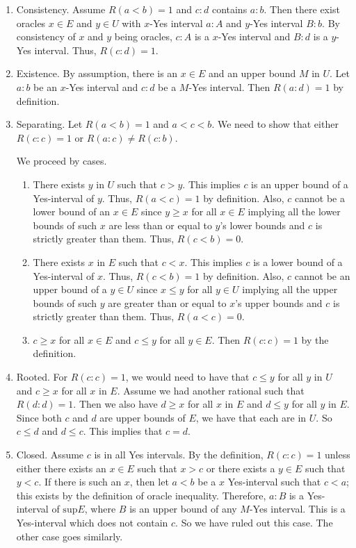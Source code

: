 \documentclass[12pt]{article}
\theoremstyle{remark}
\begin{document}
\begin{enumerate}
    \item Consistency. Assume $R(a \lt b)=1$ and $c:d$ contains $a:b$. Then there exist oracles $x \in E$ and $y \in U$ with $x$-Yes interval $a:A$ and $y$-Yes interval $B:b$. By consistency of $x$ and $y$ being oracles, $c:A$ is a $x$-Yes interval and $B:d$ is a $y$-Yes interval. Thus, $R(c:d) = 1$.
    \item Existence. By assumption, there is an $x \in E$ and an upper bound $M$ in $U$. Let $a:b$ be an $x$-Yes interval and $c:d$ be a $M$-Yes interval. Then $R(a:d) = 1$ by definition.  
    \item Separating. Let $R(a\lt b)=1$ and $a < c< b$. We need to show that either $R(c:c)=1$ or $R(a:c) \neq R(c:b)$. 

    We proceed by cases.
    \begin{enumerate}
    \item There exists $y$ in $U$ such that $c > y$. This implies $c$ is an upper bound of a Yes-interval of $y$. Thus, $R(a \lt c) = 1$ by definition. Also, $c$ cannot be a lower bound of an $x \in E$ since $y \geq x$ for all $x \in E$ implying all the lower bounds of such $x$ are less than or equal to $y$'s lower bounds and $c$ is strictly greater than them. Thus, $R(c \lt b) = 0$. 

    \item There exists $x$ in $E$ such that $c < x$.  This implies $c$ is a lower bound of a Yes-interval of $x$. Thus, $R(c \lt b) = 1$ by definition. Also, $c$ cannot be an upper bound of a $y \in U$ since $x \leq y$ for all $y \in U$ implying all the upper bounds of such $y$ are greater than or equal to $x$'s upper bounds and $c$ is strictly greater than them. Thus, $R(a \lt c) = 0$.

    \item $c \geq x$ for all $x \in E$ and $c \leq y$ for all $y \in E$. Then $R(c:c) = 1$ by the definition. 

     \end{enumerate}
    
    \item Rooted. For $R(c:c)=1$, we would need to have that $c \leq y$ for all $y$ in $U$ and $c \geq x$ for all $x$ in $E$. Assume we had another rational such that $R(d:d) = 1$. Then we also have $d \geq x$ for all $x$ in $E$ and $d \leq y$ for all $y$ in $E$. Since both $c$ and $d$ are upper bounds of $E$, we have that each are in $U$. So $c \leq d$ and $d \leq c$. This implies that $c = d$. 
    \item Closed. Assume $c$ is in all Yes intervals. By the definition, $R(c:c) = 1$ unless either there exists an $x \in E$ such that $x> c$ or there exists a $y \in E$ such that $y < c$. If there is such an $x$, then let $a\lt b$ be a $x$ Yes-interval such that $c \lt a$; this exists by the definition of oracle inequality. Therefore, $a:B$ is a Yes-interval of $\mathrm{sup} E$, where $B$ is an upper bound of any $M$-Yes interval. This is a Yes-interval which does not contain $c$. So we have ruled out this case. The other case goes similarly.
\end{enumerate}
\end{document}

